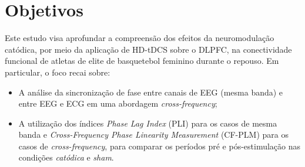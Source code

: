 \chapter{Objetivos}
\label{chap:objetivos}
Este estudo visa aprofundar a compreensão dos efeitos da neuromodulação catódica, por meio da aplicação de HD-tDCS sobre o DLPFC, na conectividade funcional de atletas de elite de basquetebol feminino durante o repouso. Em particular, o foco recai sobre:
\begin{itemize}
    \item A análise da sincronização de fase entre canais de EEG (mesma banda) e entre EEG e ECG em uma abordagem \textit{cross-frequency};
    \item A utilização dos índices \textit{Phase Lag Index} (PLI) para os casos de mesma banda e \textit{Cross-Frequency Phase Linearity Measurement} (CF-PLM) para os casos de \textit{cross-frequency}, para comparar os períodos pré e pós-estimulação nas condições \textit{catódica} e \textit{sham}.
\end{itemize}
